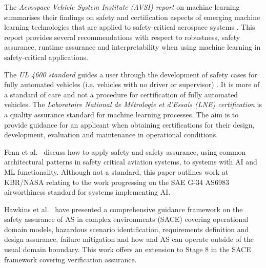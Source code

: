 The \textit{Aerospace Vehicle System Institute (AVSI) report} on machine learning summarises their findings on safety and certification aspects of emerging machine learning technologies that are applied to safety-critical aerospace systems \cite{AFE2020}. This report provides several recommendations with respect to robustness, safety assurance, runtime assurance and interpretability when using machine learning in safety-critical applications. 

The \textit{UL 4600 standard} guides a user through the development of safety cases for fully automated vehicles (i.e. vehicles with no driver or supervisor) \cite{UL4600}. It is more of a standard of care and not a procedure for certification of fully automated vehicles. The \textit{Laboratoire National de Métrologie et d'Essais (LNE) certification} \cite{LNE2021} is a quality assurance standard for machine learning processes. The aim is to provide guidance for an applicant when obtaining certifications for their design, development, evaluation and maintenance in operational conditions. 

Fenn et al.~\cite{fenn2023architecting} discuss how to apply safety and safety assurance, using common architectural patterns in safety critical aviation systems, to systems with AI and ML functionality. Although not a standard, this paper outlines work at KBR/NASA relating to the work progressing on the SAE G-34 AS6983 airworthiness standard for systems implementing AI. 

Hawkins et al.~\cite{Hawkins22} have presented a comprehensive guidance framework on the safety assurance of AS in complex environments (SACE) covering operational domain models, hazardous scenario identification, requirements definition and design assurance, failure mitigation and how and AS can operate outside of the usual domain boundary. This work offers an extension to Stage 8 in the SACE framework covering verification assurance. 


